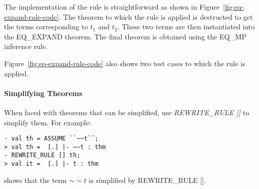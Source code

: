 The implementation of the rule is straightforward as shown in
Figure~\ref{fig:eq-expand-rule-code}.  The theorem to which the rule
is applied is destructed to get the terms corresponding to $t_1$ and
$t_2$.  These two terms are then instantiated into the EQ\_EXPAND
theorem. The final theorem is obtained using the EQ\_MP inference
rule.

Figure~\ref{fig:eq-expand-rule-code} also shows two test cases to
which the rule is applied.

\paragraph*{Simplifying Theorems}

When faced with theorems that can be simplified, use
\emph{REWRITE\_RULE []} to simplify them.  For example:

\begin{small}
\begin{verbatim}
- val th = ASSUME ``~~t``;
> val th =  [.] |- ~~t : thm
- REWRITE_RULE [] th;
> val it =  [.] |- t : thm
\end{verbatim}
\end{small}

shows that the term $\sim\sim t$ is simplified by REWRITE\_RULE [].

